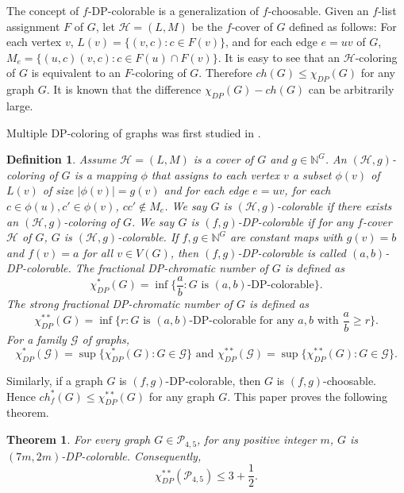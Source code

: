\documentclass{article}
\newtheorem{theorem}{Theorem}
\newtheorem{definition}{Definition}
\begin{document}
The concept of $f$-DP-colorable is a generalization of $f$-choosable. Given an $f$-list assignment $F$ of $G$, let $\mathcal{H}=(L,M)$ be the $f$-cover of $G$ defined as follows: For each vertex $v$, $L(v) = \{(v,c): c \in F(v)\}$, and for each edge $e=uv$ of $G$, $M_e= \{ (u,c)(v,c): c \in F(u) \cap F(v)\}$. It is easy to see that an $\mathcal{H}$-coloring of $G$ is equivalent to an $F$-coloring of $G$. Therefore $ch(G) \le \chi_{DP}(G)$ for any graph $G$. It is known \cite{BernshteinYuKostochkaPron} that the difference $\chi_{DP}(G)-ch(G)$ can be arbitrarily large.

Multiple DP-coloring of graphs was first studied in \cite{bernshteyn2020fractional}. 

\begin{definition}
    Assume $\mathcal{H}=(L,M)$ is a cover of $G$ and $g\in \mathbb{N}^G$. An $(\mathcal{H},g)$-coloring of $G$ is a mapping $\phi$ that assigns to each vertex $v  $ a subset  $\phi(v)$ of $ L(v)$ of size $\left | \phi(v) \right |=g(v) $ and for each edge $e=uv$, for each $c \in \phi(u), c' \in \phi(v)$, $cc' \notin M_e$. We say $G$ is $(\mathcal{H},g)$-colorable if there exists an $(\mathcal{H},g)$-coloring of $G$. We say  $G$ is $(f,g)$-DP-colorable if for any $f$-cover $\mathcal{H}$ of $G$, $G$ is $(\mathcal{H},g)$-colorable. If $f,g\in \mathbb{N}^G$ are constant maps with $g(v)=b$ and $f(v)=a$ for all $v\in V(G)$, then  $(f,g)$-DP-colorable is called $(a,b)$-DP-colorable. The \textit{fractional DP-chromatic number} of $G$ is defined as
    $$\chi^*_{DP}(G) = \inf\{ \frac ab: G \text{ is $(a,b)$-DP-colorable}\}.$$
    The \textit{strong fractional DP-chromatic number} of $G$ is defined as
    $$\chi^{**}_{DP}(G) = \inf\{ r: G \text{ is $(a,b)$-DP-colorable for any $a,b$ with $\frac ab \ge r$}\}.$$ 
    For a family $\mathcal{G}$ of graphs,  $$\chi^{*}_{DP}(\mathcal{G}) = \sup\{\chi^{*}_{DP}(G):G \in \mathcal{G}\} \text{ 
 and } \chi^{**}_{DP}(\mathcal{G}) = \sup\{\chi^{**}_{DP}(G):G \in \mathcal{G}\}.   $$
\end{definition}


Similarly,   if a graph $G$ is  $(f,g)$-DP-colorable, then $G$ is $(f,g)$-choosable. Hence $ch_f^*(G) \le \chi_{DP}^{**}(G)$ for any graph $G$.  This paper proves the following theorem.

\begin{theorem}
    \label{Th:1}
    For every graph $G \in \mathcal{P}_{4,5}$, for any positive integer $m$, $G$ is $(7m,2m)$-DP-colorable. Consequently, $$\chi^{**}_{DP}(\mathcal{P}_{4,5}) \le 3 + \frac 12.$$
\end{theorem} 
 
\end{document}
